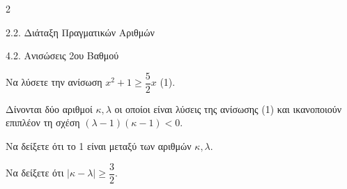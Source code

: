 \begin{ylh}{2}
    \item 2.2. Διάταξη Πραγματικών Αριθμών
    \item 4.2. Ανισώσεις 2ου Βαθμού
\end{ylh}

\begin{alist}
\item Να λύσετε την ανίσωση $x^2 + 1 \ge \dfrac{5}{2}x$ (1). 
\item Δίνονται δύο αριθμοί $\kappa, \lambda$ οι οποίοι είναι λύσεις της ανίσωσης (1) και ικανοποιούν επιπλέον τη σχέση $(\lambda - 1)(\kappa - 1) < 0$.

\begin{rlist}
\item Να δείξετε ότι το 1 είναι μεταξύ των αριθμών $\kappa, \lambda$. 
\item Να δείξετε ότι $|\kappa - \lambda| \ge \dfrac{3}{2}$. 
\end{rlist}
\end{alist}

